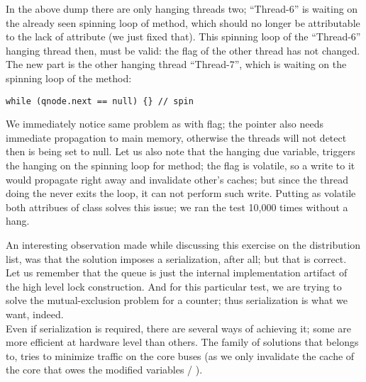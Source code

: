 In the above dump there are only hanging threads two; ``Thread-6'' is
waiting on the already seen spinning loop of  method, which should no
longer be attributable to the lack of  attribute (we just
fixed that). This spinning loop of the ``Thread-6'' hanging thread
then, must be valid: the  flag of the other thread has not
changed. \\

The new part is the other hanging thread ``Thread-7'', which is
waiting on the spinning loop of the  method: \\

\begin{lstlisting}[style=numbers]
      while (qnode.next == null) {} // spin
\end{lstlisting}
\hfill

We immediately notice same problem as with  flag; the
 pointer also needs immediate propagation to main memory,
otherwise the threads will not detect then is being set to
null. Let us also note that the hanging due  variable,
triggers the hanging on the spinning loop for  method; the
 flag is volatile, so a write to it would propagate right
away and invalidate other's caches; but since the thread doing the
 never exits the loop, it can not perform such
write. Putting as volatile both attribues of class  solves
this issue; we ran  the test 10,000 times without a hang. 

An interesting observation made while discussing this exercise on the
distribution list, was that the solution imposes a serialization,
after all; but that is correct. Let us remember that the queue is just
the internal implementation artifact of the high level lock
construction. And for this particular test, we are trying to solve the
mutual-exclusion problem for a counter; thus serialization is what we
want, indeed. \\

Even if serialization is required, there are several ways of achieving
it; some are more efficient at hardware level than others. The family
of solutions that  belongs to, tries to minimize traffic on
the core buses (as we only invalidate the cache of the core that owes
the modified variables  / ).


